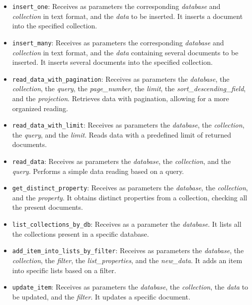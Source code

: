 \begin{itemize}
    \item \texttt{insert\_one}: Receives as parameters the corresponding \textit{database} and \textit{collection} in text format, and the \textit{data} to be inserted. It inserts a document into the specified collection.
    
    \item \texttt{insert\_many}: Receives as parameters the corresponding \textit{database} and \textit{collection} in text format, and the \textit{data} containing several documents to be inserted. It inserts several documents into the specified collection.

    \item \texttt{read\_data\_with\_pagination}: Receives as parameters the \textit{database}, the \textit{collection}, the \textit{query}, the \textit{page\_number}, the \textit{limit}, the \textit{sort\_descending\_field}, and the \textit{projection}. Retrieves data with pagination, allowing for a more organized reading.
    
    \item \texttt{read\_data\_with\_limit}: Receives as parameters the \textit{database}, the \textit{collection}, the \textit{query}, and the \textit{limit}. Reads data with a predefined limit of returned documents.
    
    \item \texttt{read\_data}: Receives as parameters the \textit{database}, the \textit{collection}, and the \textit{query}. Performs a simple data reading based on a query.
    
    \item \texttt{get\_distinct\_property}: Receives as parameters the \textit{database}, the \textit{collection}, and the \textit{property}. It obtains distinct properties from a collection, checking all the present documents.
    
    \item \texttt{list\_collections\_by\_db}: Receives as a parameter the \textit{database}. It lists all the collections present in a specific database.
    
    \item \texttt{add\_item\_into\_lists\_by\_filter}: Receives as parameters the \textit{database}, the \textit{collection}, the \textit{filter}, the \textit{list\_properties}, and the \textit{new\_data}. It adds an item into specific lists based on a filter.
    
    \item \texttt{update\_item}: Receives as parameters the \textit{database}, the \textit{collection}, the \textit{data} to be updated, and the \textit{filter}. It updates a specific document.
    

\end{itemize}
